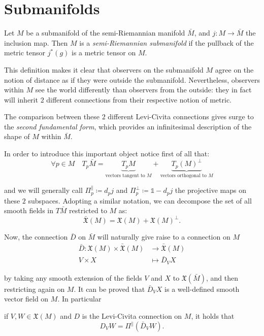 \section{Submanifolds}
\label{sec:submanifolds}

\begin{definition}
	Let \(M\) be a submanifold of the semi-Riemannian manifold \(\bar{M}\), and \(j:M\rightarrow\bar{M}\) the inclusion map. Then \(M\) is a \emph{semi-Riemannian submanifold} if the pullback of the metric tensor \(j^*(g)\) is a metric tensor on \(M\).
\end{definition}

This definition makes it clear that observers on the submanifold \(M\) agree on the notion of distance as if they were outside the submanifold. Nevertheless, observers within \(M\) see the world differently than observers from the outside: they in fact will inherit \(2\) different connections from their respective notion of metric. 

The comparison between these \(2\) different Levi-Civita connections gives surge to the \emph{second fundamental form}, which provides an infinitesimal description of the shape of \(M\) within \(\bar{M}\).

In order to introduce this important object notice first of all that:
\[
\forall p \in M \quad T_p\bar{M} = \underbrace{T_pM}_{\text{vectors tangent to }M}+ \underbrace{T_p(M)^{\perp}}_{\text{vectors orthogonal to } M}
\]

\noindent and we will generally call \(\Pi_p^{\parallel}\coloneqq d_pj\) and \(\Pi_p^{\perp}\coloneqq \mathbb{1} - d_pj\) the projective maps on these \(2\) subspaces.
Adopting a similar notation, we can decompose the set of all smooth fields in \(T\bar{M}\) restricted to \(M\) as:
\[
\bar{\mathfrak{X}}(M) = \mathfrak{X}(M) + \mathfrak{X}(M)^{\perp}.
\]

Now, the connection \(\bar{D}\) on \(\bar{M}\) will naturally give raise to a connection on \(M\)
\begin{align*}
\bar{D} : \mathfrak{X}(M) \times \bar{\mathfrak{X}}(M) & \rightarrow \bar{\mathfrak{X}}(M) \\
	 V \times X &\mapsto \bar{D}_V X
\end{align*}

by taking any smooth extension of the fields \(V\) and \(X\) to \(\mathfrak{X}(\bar{M})\), and then restricting again on \(M\). It can be proved that \(\bar{D}_V X\) is a well-defined smooth vector field on \(M\). In particular
\begin{lemma} 
	if \(V, W \in \mathfrak{X}(M)\) and \(D\) is the Levi-Civita connection on \(M\), it holds that
	\[
	D_V W = \Pi^{\parallel}\left(\bar{D}_V W\right).
	\]
\end{lemma}

